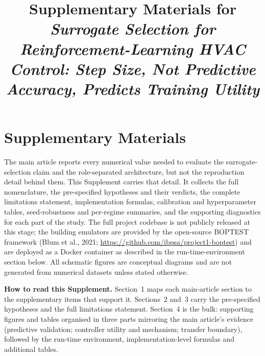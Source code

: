 \documentclass[11pt,a4paper]{article}
\title{Supplementary Materials for\\[2pt]
\emph{Surrogate Selection for Reinforcement-Learning HVAC Control: Step Size,
Not Predictive Accuracy, Predicts Training Utility}}
\author{}
\date{}
\begin{document}
\maketitle
\section*{Supplementary Materials}
The main article reports every numerical value needed to evaluate the surrogate-selection claim and the role-separated architecture, but not the reproduction detail behind them. This Supplement carries that detail. It collects the full nomenclature, the pre-specified hypotheses and their verdicts, the complete limitations statement, implementation formulas, calibration and hyperparameter tables, seed-robustness and per-regime summaries, and the supporting diagnostics for each part of the study. The full project codebase is not publicly released at this stage; the building emulators are provided by the open-source BOPTEST framework (Blum et al., 2021; \url{https://github.com/ibpsa/project1-boptest}) and are deployed as a Docker container as described in the run-time-environment section below. All schematic figures are conceptual diagrams and are not generated from numerical datasets unless stated otherwise.\par
\medskip\noindent\textbf{How to read this Supplement.} Section~1 maps each main-article section to the supplementary items that support it. Sections~2 and~3 carry the pre-specified hypotheses and the full limitations statement. Section~4 is the bulk: supporting figures and tables organised in three parts mirroring the main article's evidence (predictive validation; controller utility and mechanism; transfer boundary), followed by the run-time environment, implementation-level formulas and additional tables.\par
\medskip\noindent{}\par\medskip
\end{document}
